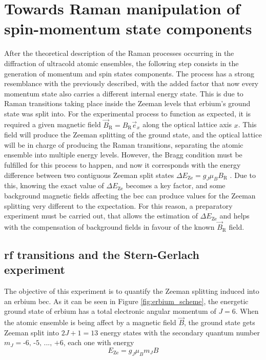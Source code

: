 
\chapter{Towards Raman manipulation of spin-momentum state components}
\label{chap:raman_manipulation}

After the theoretical description of the Raman processes occurring in the diffraction of ultracold atomic ensembles, the following step consists in the generation of momentum and spin states components. The process has a strong resemblance with the previously described, with the added factor that now every momentum state also carries a different internal energy state. This is due to Raman transitions taking place inside the Zeeman levels that erbium's ground state was split into. For the experimental process to function as expected, it is required a given magnetic field $\vec{B}_\text{R} = B_{\text{R}} \vec{e}_x$ along the optical lattice axis $x$. This field will produce the Zeeman splitting of the ground state, and the optical lattice will be in charge of producing the Raman transitions, separating the atomic ensemble into multiple energy levels. However, the Bragg condition must be fulfilled for this process to happen, and now it corresponds with the energy difference between two contiguous Zeeman split states $\Delta E_\text{Ze} = g_J \mu_B B_\text{R}$ \cite{Foot2005}. Due to this, knowing the exact value of $\Delta E_\text{Ze}$ becomes a key factor, and some background magnetic fields  affecting the \ac{bec} can produce values for the Zeeman splitting very different to the expectation. For this reason, a preparatory experiment must be carried out, that allows the estimation of $\Delta E_\text{Ze}$ and helps with the compensation of background fields in favour of the known $\vec{B}_\text{R}$ field.

\section{\Acl{rf} transitions and the Stern-Gerlach experiment}

The objective of this experiment is to quantify the Zeeman splitting induced into an erbium \ac{bec}. As it can be seen in Figure \ref{fig:erbium_scheme}, the energetic ground state of erbium has a total electronic angular momentum of $J = 6$. When the atomic ensemble is being affect by a magnetic field $\vec{B}$, the ground state gets Zeeman split into $2J+1 = 13$ energy states with the secondary quantum number $m_J = \text{-6, -5, ..., +6}$, each one with energy \cite{Foot2005}
\begin{equation}
	E_\text{Ze} = g_J \mu_B m_J B
\end{equation}

